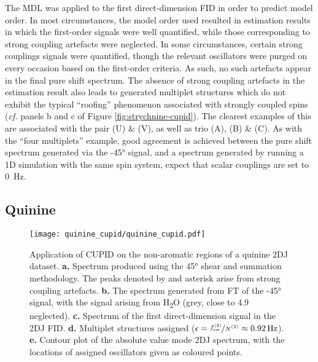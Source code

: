 The \ac{MDL} was applied to the first direct-dimension \ac{FID} in order to
predict model order. In most circumstances, the model order used resulted
in estimation results in which the first-order signals were well
quantified, while those corresponding to strong coupling artefacts were neglected.
In some circumstances, certain strong couplings signals were quantified, though
the relevant oscillators were purged on every occasion based on the first-order
criteria. As such, no such artefacts appear in the final pure shift spectrum.
The absence of strong coupling artefacts in the estimation result also leads to
generated multiplet structures which do not exhibit the typical ``roofing''
phenomenon associated with strongly coupled spins (\textit{cf.} panels b and c of
Figure \ref{fig:strychnine-cupid}). The clearest examples of this are
associated with the pair (U) \& (V), as well as trio (A), (B) \& (C). As with the
``four multiplets'' example, good agreement is achieved between the pure shift
spectrum generated via the \ang{-45} signal, and a spectrum generated by
running a \ac{1D} simulation with the same spin system, expect that scalar couplings
are set to \qty{0}{\hertz}.

\subsection{Quinine}
\begin{figure}
    \centering
    \texttt{[image: quinine\_cupid/quinine\_cupid.pdf]}
    \caption[
        Application of \acs{CUPID} on the non-aromatic regions of a quinine
        \acs{2DJ} dataset.
    ]{
        Application of \ac{CUPID} on the non-aromatic regions of a quinine
        \ac{2DJ} dataset.
        \textbf{a.} Spectrum produced using the \ang{45} shear and summation
        methodology. The peaks denoted by and asterisk arise from strong
        coupling artefacts.
        \textbf{b.} The spectrum generated from \ac{FT} of the \ang{-45}
        signal, with the signal arising from H\textsubscript{2}O (grey, close
        to \qty{4.9}{\partspermillion} neglected).
        \textbf{c.} Spectrum of the first direct-dimension signal in the
        \ac{2DJ} \ac{FID}.
        \textbf{d.} Multiplet structures assigned ($\epsilon =
        \nicefrac{\fswtwo}{\Ntwo} \approx \qty{0.92}{\hertz}$).
        \textbf{e.} Contour plot of the absolute value mode \ac{2DJ} spectrum,
        with the locations of assigned oscillators given as coloured points.
    }
    \label{fig:quinine-cupid}
\end{figure}

